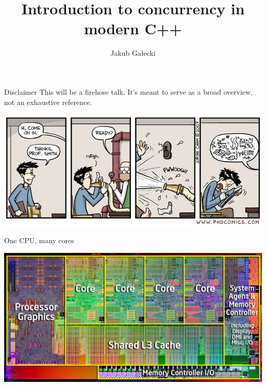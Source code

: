 \documentclass{beamer}
\title{Introduction to concurrency in modern C++}
\date{\vspace{5pt}\formatdate{24}{1}{2022}}
\author{Jakub Gałecki}
\begin{document}
\maketitle


\begin{frame}{Disclaimer}
This will be a firehose talk.
It's meant to serve as a broad overview, not an exhaustive reference.
\begin{center}
\vspace{.1cm}
\includegraphics[width=\linewidth]{firehose.jpg}
\end{center}
\end{frame}

\begin{frame}{One CPU, many cores}
\begin{center}
\includegraphics[width=\linewidth]{cpu_die.jpg}
\end{center}
\end{frame}
\end{document}
